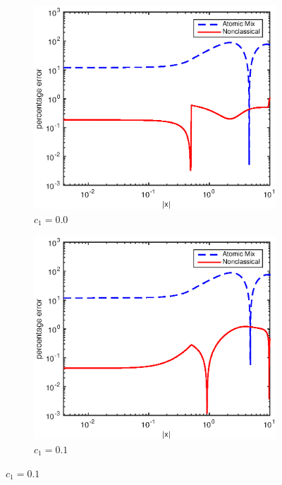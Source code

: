\documentclass[12pt]{article}
\begin{document}
{\begin{figure}[p]
    \centering
    \begin{subfigure}{0.495\textwidth}
        \centering
        \includegraphics[width=\textwidth]{NSE_err_E00.eps}
        \caption{$c_1 = 0.0$}
        \label{figerrE00}
    \end{subfigure}
    \hfill
    \begin{subfigure}{0.495\textwidth}
        \centering
        \includegraphics[width=\textwidth]{NSE_err_E10.eps}
        \caption{$c_1 = 0.1$}

\end{subfigure}
\end{figure}}
\end{document}
